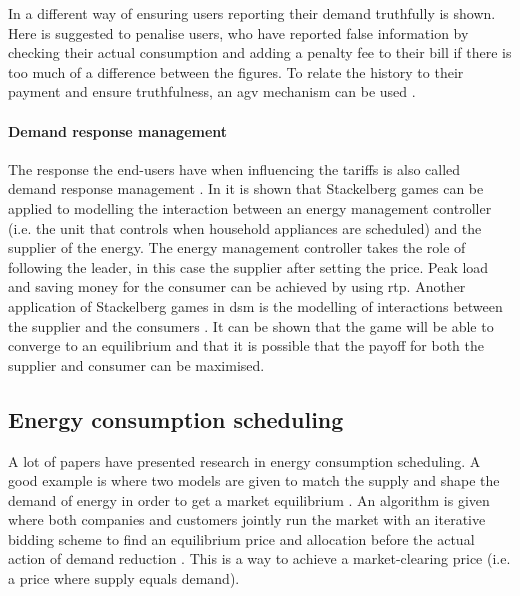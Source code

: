 In \cite{MaDengSongEtAl2014} a different way of ensuring users reporting their demand truthfully is shown. Here is suggested to penalise users, who have reported false information by checking their actual consumption and adding a penalty fee to their bill if there is too much of a difference between the figures. To relate the history to their payment and ensure truthfulness, an \ac{agv} mechanism can be used \cite{MaDengSongEtAl2014}.

\paragraph{Demand response management}
The response the end-users have when influencing the tariffs is also called demand response management \cite{MaharjanZhuZhangEtAl2013}. In \cite{ChenKishoreSnyder2011} it is shown that Stackelberg games can be applied to modelling the interaction between an energy management controller (i.e. the unit that controls when household appliances are scheduled) and the supplier of the energy. The energy management controller takes the role of following the leader, in this case the supplier after setting the price. Peak load and saving money for the consumer can be achieved by using \ac{rtp}. Another application of Stackelberg games in \ac{dsm} is the modelling of interactions between the supplier and the consumers \cite{MaharjanZhuZhangEtAl2013}. It can be shown that the game will be able to converge to an equilibrium and that it is possible that the payoff for both the supplier and consumer can be maximised. 

\subsection{Energy consumption scheduling}
A lot of papers have presented research in energy consumption scheduling. A good example is where two models are given to match the supply and shape the demand of energy in order to get a market equilibrium \cite{ChenLiLowEtAl2010}. An algorithm is given where both companies and customers jointly run the market with an iterative bidding scheme to find an equilibrium price and allocation before the actual action of demand reduction \cite{ChenLiLowEtAl2010}. This is a way to achieve a market-clearing price (i.e. a price where supply equals demand).

